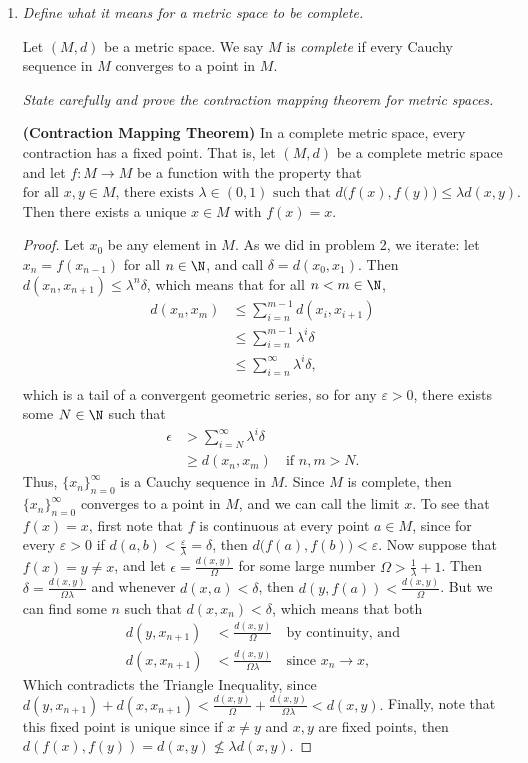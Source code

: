 \documentclass[12pt,letterpaper]{article}
\begin{document}
\begin{enumerate}
\vfill
\pagebreak
\item \textit{Define what it means for a metric space to be \emph{complete}.}
\begin{definition*}
Let $(M,d)$ be a metric space. We say $M$ is \emph{complete} if every Cauchy sequence in $M$ converges to a point in $M$. 
\end{definition*}
\textit{State carefully and prove the contraction mapping theorem for metric spaces. }
\begin{theorem*}\textbf{(Contraction Mapping Theorem)}
In a complete metric space, every contraction has a fixed point. That is, let $(M,d)$ be a complete metric space and let $f:M\to M$ be a function with the property that  
$\text{for all }x,y\in M\text{, there exists }\lambda\in(0,1)\text{ such that }d\big(f(x),f(y)\big)\leq\lambda d(x,y).$
%
Then there exists a unique $x\in M$ with $f(x)=x$. 
\end{theorem*}
\begin{proof}
Let $x_0$ be any element in $M$. As we did in problem 2, we iterate: let $x_n=f(x_{n-1})$ for all $n\in\N$, and call $\delta=d(x_0,x_1)$. Then $d(x_n,x_{n+1})\leq \lambda^n\delta$, which means that for all $n<m\in\N$,
\begin{align*}
d(x_n,x_m)&\leq\sum_{i=n}^{m-1}d(x_i,x_{i+1})\\
&\leq \sum_{i=n}^{m-1} \lambda^i\delta\\
&\leq \sum_{i=n}^{\infty} \lambda^i\delta,\\
\end{align*} 
which is a tail of a convergent geometric series, so for any $\varepsilon>0$, there exists some $N\in\N$ such that
\begin{align*}
\epsilon &> \sum_{i=N}^{\infty} \lambda^i\delta \\
&\geq d(x_n,x_m) \quad \text{if }n,m>N.
\end{align*}
Thus, $\{x_n\}_{n=0}^\infty$ is a Cauchy sequence in $M$. Since $M$ is complete, then $\{x_n\}_{n=0}^\infty$ converges to a point in $M$, and we can call the limit $x$. To see that $f(x)=x$, first note that $f$ is continuous at every point $a\in M$, since for every $\varepsilon>0$ if $d(a,b)<\frac{\varepsilon}{\lambda}=\delta$, then $d\big(f(a),f(b)\big)<\varepsilon$. Now suppose that $f(x)=y\neq x$, and let $\epsilon=\frac{d(x,y)}{\Omega}$ for some large number $\Omega>\frac{1}{\lambda}+1$.  Then $\delta=\frac{d(x,y)}{\Omega\lambda}$ and whenever ${d(x,a)<\delta}$, then $d(y,f(a))<\frac{d(x,y)}{\Omega}$. But we can find some $n$ such that $d(x,x_n)<\delta$, which means that both 
\begin{align*}
d(y,x_{n+1})&<\frac{d(x,y)}{\Omega} \quad \text{by continuity, and} \\
d(x,x_{n+1})&<\frac{d(x,y)}{\Omega\lambda} \quad \text{since }x_n\to x,
\end{align*}
Which contradicts the Triangle Inequality, since 
$d(y,x_{n+1}) + d(x,x_{n+1}) < \tfrac{d(x,y)}{\Omega} + \tfrac{d(x,y)}{\Omega\lambda} < d(x,y).$ Finally, note that this fixed point is unique since if $x\neq y$ and $x,y$ are fixed points, then ${d(f(x),f(y))=d(x,y)\not\leq\lambda d(x,y)}$.
\end{proof}



\end{enumerate}
\end{document}
